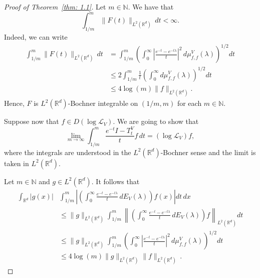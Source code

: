 \documentclass[10pt, a4paper, reqno]{amsart}
\theoremstyle{definition}
\theoremstyle{remark}
\newcommand{\NN}{\mathbb{N}}
\numberwithin{equation}{section}
\begin{document}
\begin{proof}[Proof of Theorem~\ref{thm: 1.1}]
Let $m \in \mathbb{N}$. We have that 
\[
\int_{1/m}^m \|F(t)\|_{L^2(\mathbb{R}^d)} \, dt < \infty .
\]
Indeed, we can write
\begin{equation*}
    \begin{split}
        \int_{1/m}^m \|F(t)\|_{L^2(\mathbb{R}^d)} \, dt & = \int_{1/m}^m \left( \int_0^\infty \left| \frac{e^{-t} - e^{-t\lambda}}{t} \right|^2 \, d\mu_{f,f}^V(\lambda) \right)^{1/2} dt \\
        & \leq 2 \int_{1/m}^m \frac{1}{t} \left( \int_0^\infty d\mu_{f,f}^V(\lambda) \right)^{1/2} dt \\
        & \leq 4 \log(m) \|f\|_{L^2(\mathbb{R}^d)}.
    \end{split}
\end{equation*}
Hence, $F$ is $L^2(\mathbb{R}^d)$-Bochner integrable on $(1/m, m)$ for each $m\in\NN$.

Suppose now that $f \in D(\log \mathcal{L}_V)$. We are going to show that 
\begin{equation*}
    \lim_{m \rightarrow \infty} \int_{1/m}^m \frac{e^{-t}I - T_t^V}{t} f \, dt = (\log \mathcal{L}_V) f,
\end{equation*}
where the integrals are understood in the $L^2(\mathbb{R}^d)$-Bochner sense and the limit is taken in $L^2(\mathbb{R}^d)$.

Let $m \in \mathbb{N}$ and $g \in L^2(\mathbb{R}^d)$. It follows that
\begin{equation*}
    \begin{split}
        \int_{\mathbb{R}^d} |g(x)| & \int_{1/m}^m \left|
        \left( \int_0^\infty \frac{e^{-t} - e^{-t\lambda}}{t} \, dE_V(\lambda)\right) f(x) \right| dt \, dx \\
        & \leq \|g\|_{L^2(\mathbb{R}^d)} \int_{1/m}^m \left\| \left( \int_0^\infty \frac{e^{-t} - e^{-t\lambda}}{t} \, dE_V(\lambda)\right) f \right\|_{L^2(\mathbb{R}^d)} dt \\
        & \leq \|g\|_{L^2(\mathbb{R}^d)} \int_{1/m}^m 
        \left( \int_0^\infty \left|\frac{e^{-t} - e^{-t\lambda}}{t} \right|^2 \, d\mu_{f,f}^V(\lambda) \right)^{1/2} dt \\
        & \leq 4  \log (m)\|g\|_{L^2(\mathbb{R}^d)} \|f\|_{L^2(\mathbb{R}^d)} \, .
    \end{split}
\end{equation*}


\end{proof}
\end{document}
